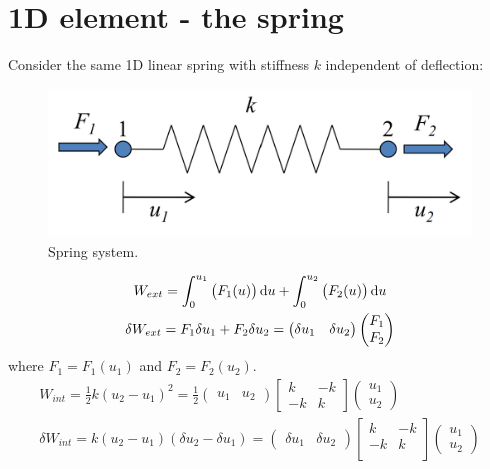 \documentclass[class=report, crop=false, 12pt,a4paper]{standalone}
\begin{document}
\section{1D element - the spring}
Consider the same 1D linear spring with stiffness $k$ independent of deflection:
\begin{figure}[H]
	\centering
	\includegraphics[width = \textwidth]{../img/figure5.png}
	\caption{Spring system.}
\end{figure}
\begin{gather}
	W_{ext} = \int_0^{u_1} \left(F_1(u)\right)\dif u + \int_{0}^{u_2} \left(F_2(u)\right)\dif u\\
	\delta W_{ext} = F_1 \delta u_1 + F_2 \delta u_2 = \begin{pmatrix}
		\delta u_1 & \delta u_2 
	\end{pmatrix} \begin{pmatrix}
		F_1\\
		F_2
	\end{pmatrix}
\end{gather}
where $F_1 = F_1\left(u_1\right)$ and $F_2 = F_2\left(u_2\right)$.
\begin{gather}
	W_{int} = \frac{1}{2}k\left(u_2- u_1\right)^2 = \frac{1}{2}\begin{pmatrix}
		u_1 & u_2
	\end{pmatrix}\begin{bmatrix}
		k & -k\\
		-k & k
	\end{bmatrix}\begin{pmatrix}
		u_1\\
		u_2
	\end{pmatrix}\\
	\delta W_{int} = k\left(u_2 - u_1\right)\left(\delta u_2 -\delta u_1\right) = \begin{pmatrix}
		\delta u_1 & \delta u_2
	\end{pmatrix}\begin{bmatrix}
		k & -k\\
		-k & k\\
	\end{bmatrix}\begin{pmatrix}
		u_1\\
		u_2
	\end{pmatrix}
\end{gather}
\end{document}
